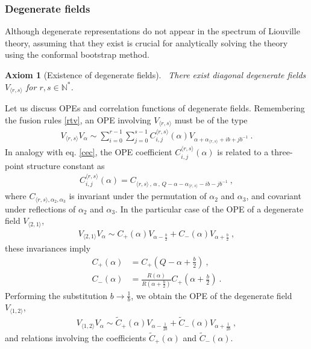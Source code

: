 \documentclass[12pt, a4paper, notitlepage, twoside]{report}
\numberwithin{equation}{section}
\theoremstyle{break}
\newtheorem{hyp}{Axiom}[chapter]
\begin{document}
\subsubsection{Degenerate fields}

Although degenerate representations do not appear in the spectrum of Liouville theory, assuming  that they exist is crucial for analytically solving the theory using the conformal bootstrap method.

\begin{hyp}[Existence of degenerate fields]
 ~\label{ax:edf}
There exist diagonal degenerate fields $V_{\langle r,s \rangle}$ for $r,s\in\mathbb{N}^*$.
\end{hyp}
\noindent
Let us discuss OPEs and correlation functions of degenerate fields. 
Remembering the fusion rules \eqref{rtv}, an OPE involving $V_{\langle r,s \rangle}$ must be of the type
\begin{align}
 \boxed{V_{\langle r,s \rangle} V_\alpha \sim \sum_{i=0}^{r-1}\sum_{j=0}^{s-1} C_{i,j}^{\langle r,s \rangle}(\alpha) V_{\alpha+\alpha_{\langle r,s \rangle}+ib+jb^{-1}}}\ .
\label{vrsv}
\end{align}
In analogy with eq. \eqref{cec}, the OPE coefficient $C_{i,j}^{\langle r,s \rangle}(\alpha)$ is related to a three-point structure constant  as 
\begin{align}
 C_{i,j}^{\langle r,s \rangle}(\alpha) = C_{\langle r,s \rangle\, ,\, \alpha\, ,\, Q-\alpha-\alpha_{\langle r,s \rangle}-ib-jb^{-1}}\ , 
\end{align}
where $C_{\langle r,s \rangle, \alpha_2,\alpha_3}$ is invariant under the permutation of $\alpha_2$ and $\alpha_3$, and covariant under reflections of $\alpha_2$ and $\alpha_3$.
In the particular case of the OPE of a degenerate field $V_{\langle 2,1 \rangle}$,
\begin{align}
 \boxed{V_{\langle 2,1 \rangle} V_\alpha \sim C_+(\alpha) V_{\alpha-\frac{b}{2}} + C_-(\alpha) V_{\alpha+\frac{b}{2}}}\ ,
\label{vot}
\end{align}
 these invariances imply 
\begin{align}
 C_+(\alpha) &= C_+(Q-\alpha+\tfrac{b}{2})\ ,
\label{cpcp}
\\
C_-(\alpha) & = \frac{R(\alpha)}{R(\alpha+\tfrac{b}{2})} C_+(\alpha+\tfrac{b}{2})\ . 
\label{cmcp}
\end{align}
Performing the substitution $b\to \frac{1}{b}$, we obtain
the OPE of the degenerate field $V_{\langle 1,2 \rangle}$,
\begin{align}
\boxed{V_{\langle 1,2 \rangle} V_\alpha \sim \tilde{C}_+(\alpha) V_{\alpha-\frac{1}{2b}} + \tilde{C}_-(\alpha) V_{\alpha+\frac{1}{2b}}}\ ,
 \label{vto}
\end{align}
and relations involving the coefficients $\tilde{C}_+(\alpha)$ and $\tilde{C}_-(\alpha)$. 
\end{document}
